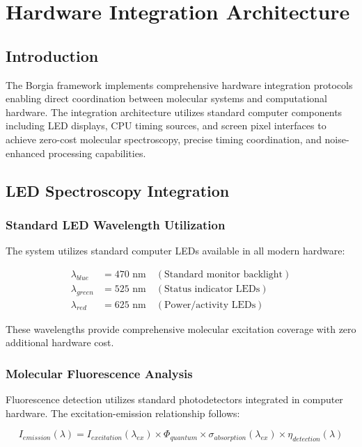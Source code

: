 \section{Hardware Integration Architecture}

\subsection{Introduction}

The Borgia framework implements comprehensive hardware integration protocols enabling direct coordination between molecular systems and computational hardware. The integration architecture utilizes standard computer components including LED displays, CPU timing sources, and screen pixel interfaces to achieve zero-cost molecular spectroscopy, precise timing coordination, and noise-enhanced processing capabilities.

\subsection{LED Spectroscopy Integration}

\subsubsection{Standard LED Wavelength Utilization}

The system utilizes standard computer LEDs available in all modern hardware:

\begin{align}
\lambda_{blue} &= 470 \text{ nm} \quad (\text{Standard monitor backlight}) \\
\lambda_{green} &= 525 \text{ nm} \quad (\text{Status indicator LEDs}) \\
\lambda_{red} &= 625 \text{ nm} \quad (\text{Power/activity LEDs})
\end{align}

These wavelengths provide comprehensive molecular excitation coverage with zero additional hardware cost.

\subsubsection{Molecular Fluorescence Analysis}

Fluorescence detection utilizes standard photodetectors integrated in computer hardware. The excitation-emission relationship follows:

\begin{equation}
I_{emission}(\lambda) = I_{excitation}(\lambda_{ex}) \times \Phi_{quantum} \times \sigma_{absorption}(\lambda_{ex}) \times \eta_{detection}(\lambda)
\end{equation}

